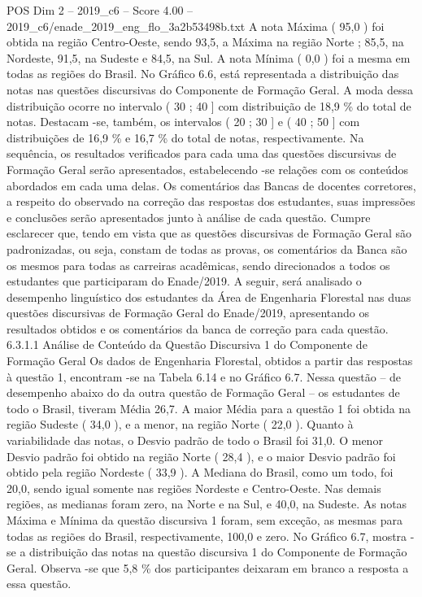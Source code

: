 \begin{textsample}{POS Dim 2 – 2019\_c6 – Score 4.00 – 2019\_c6/enade\_2019\_eng\_flo\_3a2b53498b.txt}
A nota Máxima ( 95,0 ) foi obtida na região Centro-Oeste, sendo 93,5, a Máxima na região Norte ; 85,5, na Nordeste, 91,5, na Sudeste e 84,5, na Sul.
A nota Mínima ( 0,0 ) foi a mesma em todas as regiões do Brasil.
No Gráfico 6.6, está representada a distribuição das notas nas questões discursivas do Componente de Formação Geral.
A moda dessa distribuição ocorre no intervalo ( 30 ; 40 ] com distribuição de 18,9 \% do total de notas.
Destacam -se, também, os intervalos ( 20 ; 30 ] e ( 40 ; 50 ] com distribuições de 16,9 \% e 16,7 \% do total de notas, respectivamente.
Na sequência, os resultados verificados para cada uma das questões discursivas de Formação Geral serão apresentados, estabelecendo -se relações com os conteúdos abordados em cada uma delas.
Os comentários das Bancas de docentes corretores, a respeito do observado na correção das respostas dos estudantes, suas impressões e conclusões serão apresentados junto à análise de cada questão.
Cumpre esclarecer que, tendo em vista que as questões discursivas de Formação Geral são padronizadas, ou seja, constam de todas as provas, os comentários da Banca são os mesmos para todas as carreiras acadêmicas, sendo direcionados a todos os estudantes que participaram do Enade/2019.
A seguir, será analisado o desempenho linguístico dos estudantes da Área de Engenharia Florestal nas duas questões discursivas de Formação Geral do Enade/2019, apresentando os resultados obtidos e os comentários da banca de correção para cada questão. 6.3.1.1 Análise de Conteúdo da Questão Discursiva 1 do Componente de Formação Geral Os dados de Engenharia Florestal, obtidos a partir das respostas à questão 1, encontram -se na Tabela 6.14 e no Gráfico 6.7.
Nessa questão – de desempenho abaixo do da outra questão de Formação Geral – os estudantes de todo o Brasil, tiveram Média 26,7.
A maior Média para a questão 1 foi obtida na região Sudeste ( 34,0 ), e a menor, na região Norte ( 22,0 ).
Quanto à variabilidade das notas, o Desvio padrão de todo o Brasil foi 31,0.
O menor Desvio padrão foi obtido na região Norte ( 28,4 ), e o maior Desvio padrão foi obtido pela região Nordeste ( 33,9 ).
A Mediana do Brasil, como um todo, foi 20,0, sendo igual somente nas regiões Nordeste e Centro-Oeste.
Nas demais regiões, as medianas foram zero, na Norte e na Sul, e 40,0, na Sudeste.
As notas Máxima e Mínima da questão discursiva 1 foram, sem exceção, as mesmas para todas as regiões do Brasil, respectivamente, 100,0 e zero.
No Gráfico 6.7, mostra -se a distribuição das notas na questão discursiva 1 do Componente de Formação Geral.
Observa -se que 5,8 \% dos participantes deixaram em branco a resposta a essa questão.

\end{textsample}
